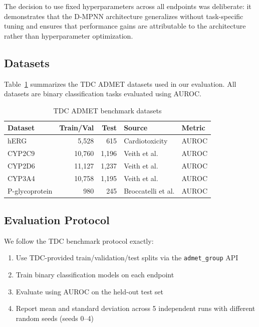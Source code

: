 \documentclass[11pt]{article}
\begin{document}
The decision to use fixed hyperparameters across all endpoints was deliberate: it demonstrates that the D-MPNN architecture generalizes without task-specific tuning and ensures that performance gains are attributable to the architecture rather than hyperparameter optimization.

\subsection{Datasets}

Table~\ref{tab:datasets} summarizes the TDC ADMET datasets used in our evaluation. All datasets are binary classification tasks evaluated using AUROC.

\begin{table}[h]
\centering
\caption{TDC ADMET benchmark datasets}
\label{tab:datasets}
\begin{tabular}{lrrll}
\toprule
Dataset & Train/Val & Test & Source & Metric \\
\midrule
hERG & 5,528 & 615 & Cardiotoxicity & AUROC \\
CYP2C9 & 10,760 & 1,196 & Veith et al. & AUROC \\
CYP2D6 & 11,127 & 1,237 & Veith et al. & AUROC \\
CYP3A4 & 10,758 & 1,195 & Veith et al. & AUROC \\
P-glycoprotein & 980 & 245 & Broccatelli et al. & AUROC \\
\bottomrule
\end{tabular}
\end{table}

\subsection{Evaluation Protocol}

We follow the TDC benchmark protocol exactly:

\begin{enumerate}
    \item Use TDC-provided train/validation/test splits via the \texttt{admet\_group} API
    \item Train binary classification models on each endpoint
    \item Evaluate using AUROC on the held-out test set
    \item Report mean and standard deviation across 5 independent runs with different random seeds (seeds 0--4)
\end{enumerate}
\end{document}
